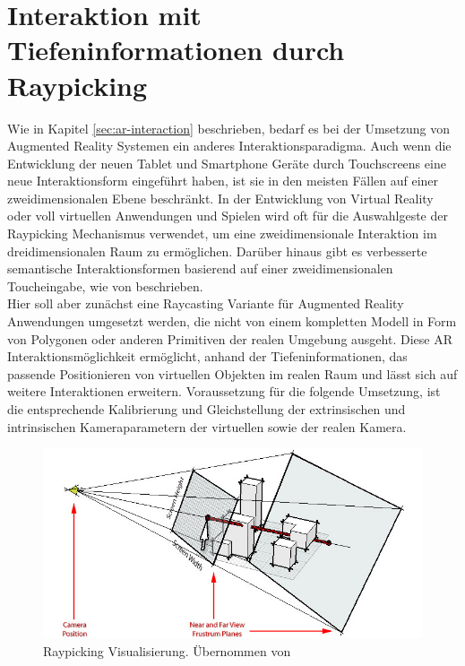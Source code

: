 \section{Interaktion mit Tiefeninformationen durch Raypicking} \label{sec:ar-depth-interaction}

Wie in Kapitel \ref{sec:ar-interaction} beschrieben, bedarf es bei der Umsetzung von Augmented Reality Systemen ein anderes Interaktionsparadigma. Auch wenn die Entwicklung der neuen Tablet und Smartphone Geräte durch Touchscreens eine neue Interaktionsform eingeführt haben, ist sie in den meisten Fällen auf einer zweidimensionalen Ebene beschränkt. In der Entwicklung von Virtual Reality oder voll virtuellen Anwendungen und Spielen wird oft für die Auswahlgeste der Raypicking Mechanismus verwendet, um eine zweidimensionale Interaktion im dreidimensionalen Raum zu ermöglichen. Darüber hinaus gibt es verbesserte semantische Interaktionsformen basierend auf einer zweidimensionalen Toucheingabe, wie von \citet{elmqvist2008semantic} beschrieben.\\

Hier soll aber zunächst eine Raycasting Variante für Augmented Reality Anwendungen umgesetzt werden, die nicht von einem kompletten Modell in Form von Polygonen oder anderen Primitiven der realen Umgebung ausgeht. Diese AR Interaktionsmöglichkeit ermöglicht, anhand der Tiefeninformationen, das passende Positionieren von virtuellen Objekten im realen Raum und lässt sich auf weitere Interaktionen erweitern. Voraussetzung für die folgende Umsetzung, ist die entsprechende Kalibrierung und Gleichstellung der extrinsischen und intrinsischen Kameraparametern der virtuellen sowie der realen Kamera. \\

\begin{figure}[h]
  \centering
	\includegraphics[width=1.0\textwidth]{content/images/methods/interaction.jpg} 
  \caption{Raypicking Visualisierung. Übernommen von \citet{gluUn11:online}}
  \label{fig:interaction}
\end{figure}

